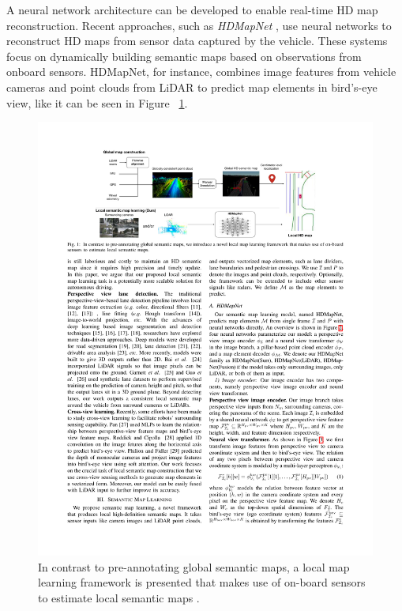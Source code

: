 A neural network architecture can be developed to enable real-time HD map reconstruction. Recent approaches, such as \textit{HDMapNet} \cite{li2022hdmapnetonlinehdmap}, use neural networks to reconstruct HD maps from sensor data captured by the vehicle. These systems focus on dynamically building semantic maps based on observations from onboard sensors. HDMapNet, for instance, combines image features from vehicle cameras and point clouds from LiDAR to predict map elements in bird's-eye view, like it can be seen in Figure ~\ref{fig:hd_map_net}.
\begin{figure}[H]
    \centering
    \includegraphics[width=1\linewidth]{LateX//figs/HDmapNET_compressed.pdf}
    \caption{In contrast to pre-annotating global semantic maps, a local map learning framework is presented that makes use of on-board sensors to estimate local semantic maps \cite{li2022hdmapnetonlinehdmap}.}
    \label{fig:hd_map_net}
\end{figure}

